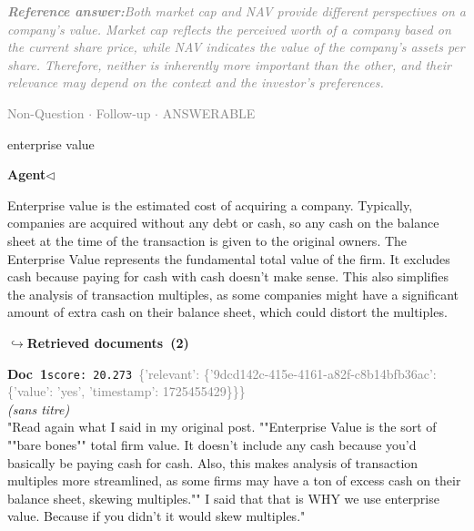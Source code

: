\documentclass[a4paper,11pt]{article}
\begin{document}
\begin{refanswerenv}
{\footnotesize\textit{\textcolor{gray}{\textbf{Reference answer:}\enspace Both market cap and NAV provide different perspectives on a company's value. Market cap reflects the perceived worth of a company based on the current share price, while NAV indicates the value of the company's assets per share. Therefore, neither is inherently more important than the other, and their relevance may depend on the context and the investor's preferences.}}}
\end{refanswerenv}
\vspace{0.5em}
\hfill{\tiny\textcolor{gray}{Non-Question $\cdot$ Follow-up $\cdot$ ANSWERABLE}}
\begin{userbubble}
enterprise value
\end{userbubble}
\noindent\hfill{\small\textcolor{agentcolor}{\textbf{Agent\enspace$\triangleleft$}}}
\begin{agentbubble}
Enterprise value is the estimated cost of acquiring a company. Typically, companies are acquired without any debt or cash, so any cash on the balance sheet at the time of the transaction is given to the original owners. The Enterprise Value represents the fundamental total value of the firm. It excludes cash because paying for cash with cash doesn't make sense. This also simplifies the analysis of transaction multiples, as some companies might have a significant amount of extra cash on their balance sheet, which could distort the multiples.
\end{agentbubble}
\noindent\hfill{\footnotesize\textcolor{doccolor}{\textbf{$\hookrightarrow$\enspace Retrieved documents~(2)}}}
\begin{docenv}
{\footnotesize\textcolor{doccolor}{\textbf{Doc~1}}}\hfill{\tiny\texttt{score:~20.273}}\ {\tiny\textcolor{gray}{\{'relevant': \{'9dcd142c-415e-4161-a82f-c8b14bfb36ac': \{'value': 'yes', 'timestamp': 1725455429\}\}\}}}\\[3pt]
{\small\textit{(sans titre)}}\\[2pt]
\vspace{2pt}
{\footnotesize 
"Read again what I said in my original post.  ""Enterprise Value is the sort of ""bare bones"" total firm value. It doesn't include any cash because you'd basically be paying cash for cash. Also, this makes analysis of transaction multiples more streamlined, as some firms may have a ton of excess cash on their balance sheet, skewing multiples.""  I said that that is WHY we use enterprise value. Because if you didn't it would skew multiples."}
\end{docenv}
\end{document}
